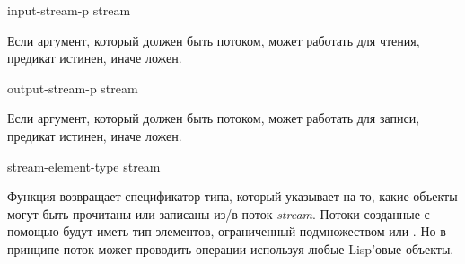 \begin{defun}[Функция]
input-stream-p stream

Если аргумент, который должен быть потоком, может работать для чтения, предикат
истинен, иначе ложен.
\end{defun}

\begin{defun}[Функция]
output-stream-p stream

Если аргумент, который должен быть потоком, может работать для записи, предикат
истинен, иначе ложен.
\end{defun}

\begin{defun}[Функция]
stream-element-type stream

Функция возвращает спецификатор типа, который указывает на то, какие объекты
могут быть прочитаны или записаны из/в поток \emph{stream}.
Потоки созданные с помощью  будут иметь тип элементов, ограниченный
подмножеством  или . Но в принципе поток может
проводить операции используя любые Lisp'овые объекты.
\end{defun}

